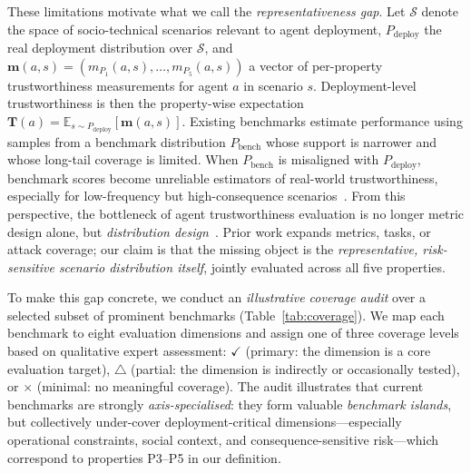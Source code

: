\label{sec:gap}These limitations motivate what we call the \emph{representativeness gap}. Let $\mathcal{S}$ denote the space of socio-technical scenarios relevant to agent deployment, $P_{\mathrm{deploy}}$ the real deployment distribution over $\mathcal{S}$, and $\mathbf{m}(a,s)=(m_{P_1}(a,s),\dots,m_{P_5}(a,s))$ a vector of per-property trustworthiness measurements for agent $a$ in scenario $s$. Deployment-level trustworthiness is then the property-wise expectation $\mathbf{T}(a) = \mathbb{E}_{s \sim P_{\mathrm{deploy}}}[\mathbf{m}(a,s)]$. Existing benchmarks estimate performance using samples from a benchmark distribution $P_{\mathrm{bench}}$ whose support is narrower and whose long-tail coverage is limited. When $P_{\mathrm{bench}}$ is misaligned with $P_{\mathrm{deploy}}$, benchmark scores become unreliable estimators of real-world trustworthiness, especially for low-frequency but high-consequence scenarios~\cite{eriksson2025trustbenchmarks}. From this perspective, the bottleneck of agent trustworthiness evaluation is no longer metric design alone, but \emph{distribution design}~\cite{liang2023helm,kiela2021dynabench,shirali2022dynamicbench,koh2021wilds}. Prior work expands metrics, tasks, or attack coverage; our claim is that the missing object is the \emph{representative, risk-sensitive scenario distribution itself}, jointly evaluated across all five properties.

\label{para:coverage_audit}
To make this gap concrete, we conduct an \emph{illustrative coverage audit} over a selected subset of prominent benchmarks (Table~\ref{tab:coverage}). We map each benchmark to eight evaluation dimensions and assign one of three coverage levels based on qualitative expert assessment: $\checkmark$ (primary: the dimension is a core evaluation target), $\triangle$ (partial: the dimension is indirectly or occasionally tested), or $\times$ (minimal: no meaningful coverage). The audit illustrates that current benchmarks are strongly \emph{axis-specialised}: they form valuable \emph{benchmark islands}, but collectively under-cover deployment-critical dimensions---especially operational constraints, social context, and consequence-sensitive risk---which correspond to properties P3--P5 in our definition.

